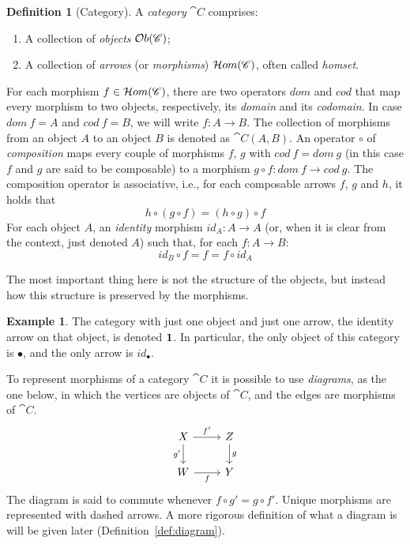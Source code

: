 \documentclass[a4paper, twoside,openright]{report}
\theoremstyle{plain}
\theoremstyle{definition}
\newtheorem{definition}[theorem]{Definition}
\newtheorem{example}[theorem]{Example}
\begin{document}
\begin{definition}[Category]\label{def:category}
    A \emph{category} $\cat{C}$ comprises:
    \begin{enumerate}
        \item A collection of \emph{objects} $\mathcal{O}b(\mathscr{C})$;
        \item A collection of \emph{arrows} (or \emph{morphisms}) $\mathcal{H}om(\mathscr{C})$, often called \emph{homset}.
    \end{enumerate}
    For each morphism $f \in \mathcal{H}om(\mathscr{C})$, there are two operators $dom$ and $cod$ that map every morphism to two objects, respectively, its \emph{domain} and its \emph{codomain}. In case $dom\ f = A$ and $cod\ f = B$, we will write $f: A \rightarrow B$. The collection of morphisms from an object $A$ to an object $B$ is denoted as $\cat{C}(A, B)$.
    An operator $\circ$ of \emph{composition} maps every couple of morphisms $f$, $g$ with $cod\ f = dom \ g$ (in this case $f$ and $g$ are said to be composable) to a morphism $g \circ f : dom\ f \rightarrow cod \ g$. The composition operator is associative, i.e., for each composable arrows $f$, $g$ and $h$, it holds that
    $$
        h \circ (g \circ f) = (h\circ g) \circ f
    $$
    For each object $A$, an \emph{identity} morphism $id_A : A \rightarrow A$ (or, when it is clear from the context, just denoted $A$)  such that, for each $f: A \rightarrow B$:
    \[
        id_B \circ f = f = f \circ id_A 
    \]
\end{definition}

The most important thing here is not the structure of the objects, but instead how this structure is preserved by the morphisms.

\begin{example}\label{ex:1_cat}
    The category with just one object and just one arrow, the identity arrow on that object, is denoted $\textbf 1$. In particular, the only object of this category is $\bullet$, and the only arrow is $id_{\bullet}$.
\end{example}

To represent morphisms of a category $\cat{C}$ it is possible to use \emph{diagrams}, as the one below, in which the vertices are objects of $\cat{C}$, and the edges are morphisms of $\cat{C}$.
    \[
    \begin{tikzcd}
        X \arrow[d, "g'" swap] \arrow[r, "f'"] & Z \arrow[d, "g"] \\
        W \arrow[r, "f" swap] & Y        
    \end{tikzcd}
    \]
The diagram is said to commute whenever  $f \circ g' = g \circ f'$. Unique morphisms are represented with dashed arrows.
A more rigorous definition of what a diagram is will be given later (Definition~\ref{def:diagram}).
\end{document}
